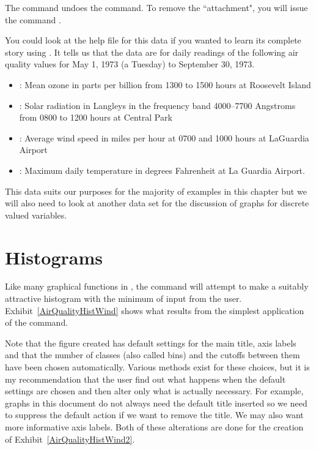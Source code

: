 The  command undoes the  command. To remove the ``attachment", you will issue the command . 
 
You could look at the help file for this data if you wanted to learn its complete story using . It tells us that the data are for daily readings of the following air quality values for May 1, 1973 (a 
Tuesday) to September 30, 1973. 
\begin{itemize} 
\item {}: Mean ozone in parts per 
billion from 1300 to 1500 hours at Roosevelt Island 
\item {}: Solar radiation 
in Langleys in the frequency band 4000--7700 Angstroms from 
0800 to 1200 hours at Central Park 
\item {}: Average wind speed in miles 
per hour at 0700 and 1000 hours at LaGuardia Airport 
\item {}: Maximum daily 
temperature in degrees Fahrenheit at La Guardia Airport. 
\end{itemize} 
 
This data suits our purposes for the majority of examples in this chapter but we will also need to look at another data set for the discussion of graphs for discrete valued variables. 
 
\section{Histograms} 
 
Like many graphical functions in \R{}, the  command will attempt to make a suitably attractive histogram with the minimum of input from the user. Exhibit~\ref{AirQualityHistWind} shows what results from the simplest application of the  command. 
 
Note that the figure created has default settings for the main title, axis labels and that the number of classes (also called bins) and the cutoffs between them have been chosen automatically. Various methods exist for these choices, but it is my recommendation that the user find out what happens when the default settings are chosen and then alter only what is actually necessary. For example, graphs in this document do not always need the default title inserted so we need to suppress the default action if we want to remove the title. We may also want more informative axis labels. Both of these alterations are done for the creation of Exhibit~\ref{AirQualityHistWind2}.  
 
